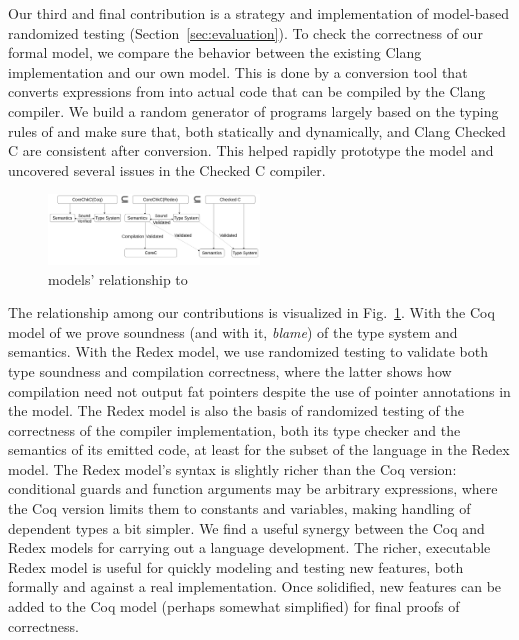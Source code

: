 
 Our third and final
contribution is a strategy and implementation of model-based
randomized testing (Section~\ref{sec:evaluation}).  To check the
correctness of our formal model, we compare the behavior between the
existing Clang \checkedc implementation and our own model. This is
done by a conversion tool that converts expressions from \lang into
actual \checkedc code that can be compiled by the Clang \checkedc
compiler. We build a random generator of programs largely based on the
typing rules of \lang and make sure that, both statically and
dynamically, \lang and Clang Checked C are consistent after
conversion.  This helped rapidly prototype the model and uncovered
several issues in the Checked C compiler.

\begin{figure}
\includegraphics[width=0.5\textwidth]{relationship.pdf}
\caption{
    \lang models' relationship to \checkedc
}
  \label{fig:model-relation}
\end{figure}

   The
  relationship among our contributions is visualized in
  Fig.~\ref{fig:model-relation}. With the Coq model of \lang we prove
  soundness (and with it, \emph{blame}) of the \checkedc type system
  and semantics. With the Redex model, we use randomized testing to
  validate both type soundness and compilation correctness, where the
  latter shows how compilation need not output fat pointers despite
  the use of pointer annotations in the \lang model. The Redex \lang
  model is also the basis of randomized testing of the correctness of
  the \checkedc compiler implementation, both its type checker and the
  semantics of its emitted code, at least for the subset of the
  language in the Redex model. The Redex model's syntax
  is slightly richer than the Coq version: conditional guards and
  function arguments may be arbitrary expressions, where the Coq
  version limits them to constants and variables, making handling of
  dependent types a bit simpler. We find a useful synergy between the
  Coq and Redex models for carrying out a language development. The
  richer, executable Redex model is useful for quickly modeling and
  testing new features, both formally and against a real
  implementation. Once solidified, new features can be added to the
  Coq model (perhaps somewhat simplified) for final proofs of
  correctness.

